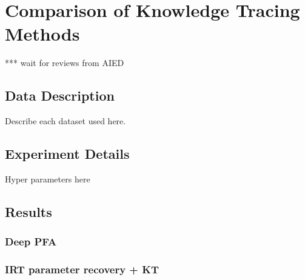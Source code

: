 \chapter{Comparison of Knowledge Tracing Methods}
***  wait for reviews from AIED

\section{Data Description}
Describe each dataset used here.

\section{Experiment Details}
Hyper parameters here

\section{Results}

\subsection{Deep PFA}

\subsection{IRT parameter recovery + KT}


